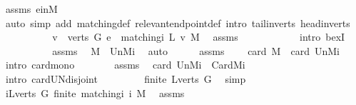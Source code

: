 \begin{isabellebody}
\ assms\ e{\isacharunderscore}inM\ \isanewline
\ \ \ \ \ \ \ \ \isamarkupfalse%
\ {\isacharparenleft}auto\ simp\ add{\isacharcolon}\ matching{\isacharunderscore}def\ relevant{\isacharunderscore}endpoint{\isacharunderscore}def\ intro{\isacharcolon}\ tail{\isacharunderscore}in{\isacharunderscore}verts\ head{\isacharunderscore}in{\isacharunderscore}verts{\isacharparenright}\isanewline
\ \ \ \ \ \ \isamarkupfalse%
\ \isamarkupfalse%
\ {\isachardoublequoteopen}{\isasymexists}\ v\ {\isasymin}\ verts\ G{\isachardot}\ e\ {\isasymin}\ matching{\isacharunderscore}i\ {\isacharparenleft}L\ v{\isacharparenright}\ M{\isachardoublequoteclose}\ \isamarkupfalse%
\ assms\ {}\ {}\isanewline
\ \ \ \ \ \ \ \ \isamarkupfalse%
\ {\isacharparenleft}intro\ bexI{\isacharparenright}\ \isanewline
\ \ \ \ \isacommand{{\isacharbraceright}}\isamarkupfalse%
\isanewline
\ \ \ \ \isamarkupfalse%
\ assms\ \isamarkupfalse%
\ {\isachardoublequoteopen}M\ {\isasymsubseteq}\ {\isacharquery}UnMi{\isachardoublequoteclose}\ \isamarkupfalse%
\ {\isacharparenleft}auto{\isacharparenright}\isanewline
\ \ \ \ \isamarkupfalse%
\ assms\ \ {}\ \isamarkupfalse%
\ {\isachardoublequoteopen}card\ M\ {\isasymle}\ card\ {\isacharquery}UnMi{\isachardoublequoteclose}\ \isamarkupfalse%
\ {\isacharparenleft}intro\ card{\isacharunderscore}mono{\isacharparenright}\isanewline
\ \ \ \ \isamarkupfalse%
\ \isamarkupfalse%
\ assms\ \isamarkupfalse%
\ {\isachardoublequoteopen}card\ {\isacharquery}UnMi\ {\isacharequal}\ {\isacharquery}CardMi{\isachardoublequoteclose}\isanewline
\ \ \ \ \isamarkupfalse%
\ {\isacharparenleft}intro\ card{\isacharunderscore}UN{\isacharunderscore}disjoint{\isacharparenright}\ \isanewline
\ \ \ \ \ \ \isamarkupfalse%
\ {\isachardoublequoteopen}finite\ {\isacharparenleft}L{\isacharbackquote}verts\ G{\isacharparenright}{\isachardoublequoteclose}\ \isamarkupfalse%
\ simp\isanewline
\ \ \ \ \isamarkupfalse%
\ \isanewline
\ \ \ \ \ \ \isamarkupfalse%
\ {\isachardoublequoteopen}{\isasymforall}i{\isasymin}L{\isacharbackquote}verts\ G{\isachardot}\ finite\ {\isacharparenleft}matching{\isacharunderscore}i\ i\ M{\isacharparenright}{\isachardoublequoteclose}\ \isamarkupfalse%
\ assms\isanewline
\ \ \ \ \ \ \ \ \isamarkupfalse%

\end{isabellebody}
